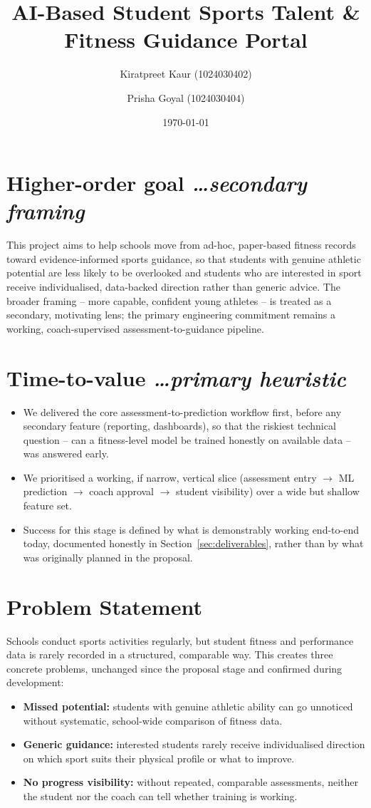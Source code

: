 \documentclass[11pt,a4paper]{article}
\title{AI-Based Student Sports Talent \& Fitness Guidance Portal}
\author{
  Kiratpreet Kaur (1024030402) \and Prisha Goyal (1024030404)
}
\date{\today}
\newcommand{\BvrHint}[1]{%
  {\normalfont\normalsize\itshape\hfill #1}}
\begin{document}
\maketitle

\section{Higher-order goal%
  \BvrHint{\ldots secondary framing}}
This project aims to help schools move from ad-hoc,
paper-based fitness records toward evidence-informed
sports guidance, so that students with genuine athletic
potential are less likely to be overlooked and students
who are interested in sport receive individualised,
data-backed direction rather than generic advice. The
broader framing -- more capable, confident young athletes
-- is treated as a secondary, motivating lens; the
primary engineering commitment remains a working,
coach-supervised assessment-to-guidance pipeline.

\section{Time-to-value %
\BvrHint{\ldots primary heuristic}}
\begin{itemize}[leftmargin=0.7cm]
    \item We delivered the core assessment-to-prediction workflow first, before any secondary feature (reporting, dashboards), so that the riskiest technical question -- can a fitness-level model be trained honestly on available data -- was answered early.
    \item We prioritised a working, if narrow, vertical slice (assessment entry $\to$ ML prediction $\to$ coach approval $\to$ student visibility) over a wide but shallow feature set.
    \item Success for this stage is defined by what is demonstrably working end-to-end today, documented honestly in Section~\ref{sec:deliverables}, rather than by what was originally planned in the proposal.
\end{itemize}

\section{Problem Statement}
Schools conduct sports activities regularly, but student
fitness and performance data is rarely recorded in a
structured, comparable way. This creates three concrete
problems, unchanged since the proposal stage and
confirmed during development:
\begin{itemize}[leftmargin=0.7cm]
    \item \textbf{Missed potential:} students with genuine athletic ability can go unnoticed without systematic, school-wide comparison of fitness data.
    \item \textbf{Generic guidance:} interested students rarely receive individualised direction on which sport suits their physical profile or what to improve.
    \item \textbf{No progress visibility:} without repeated, comparable assessments, neither the student nor the coach can tell whether training is working.
\end{itemize}
\end{document}
